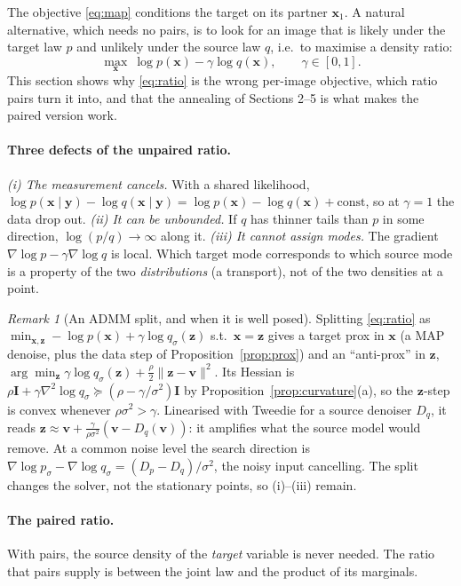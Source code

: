 \documentclass[11pt]{article}
\theoremstyle{definition}
\theoremstyle{remark}
\newtheorem{remark}{Remark}
\newcommand{\x}{\bm{x}}
\newcommand{\y}{\bm{y}}
\newcommand{\vv}{\bm{v}}
\newcommand{\Id}{\bm{I}}
\newcommand{\grad}{\nabla}
\begin{document}
The objective \eqref{eq:map} conditions the target on its partner $\x_1$. A natural
alternative, which needs no pairs, is to look for an image that is likely under the target
law $p$ and unlikely under the source law $q$, i.e.\ to maximise a density ratio:
\begin{equation}
  \max_{\x}\ \log p(\x) - \gamma\log q(\x),\qquad \gamma\in[0,1].
  \label{eq:ratio}
\end{equation}
This section shows why \eqref{eq:ratio} is the wrong per-image objective, which ratio pairs
turn it into, and that the annealing of Sections 2--5 is what makes the paired version work.

\paragraph{Three defects of the unpaired ratio.}
\emph{(i) The measurement cancels.} With a shared likelihood,
$\log p(\x\mid\y) - \log q(\x\mid\y) = \log p(\x) - \log q(\x) + \mathrm{const}$, so at
$\gamma=1$ the data drop out. \emph{(ii) It can be unbounded.} If $q$ has thinner tails than $p$
in some direction, $\log(p/q)\to\infty$ along it. \emph{(iii) It cannot assign modes.} The
gradient $\grad\log p - \gamma\grad\log q$ is local. Which target mode corresponds to which
source mode is a property of the two \emph{distributions} (a transport), not of the two
densities at a point.

\begin{remark}[An ADMM split, and when it is well posed]
Splitting \eqref{eq:ratio} as $\min_{\x,\bm z} -\log p(\x) + \gamma\log q_\sigma(\bm z)$ s.t.\
$\x=\bm z$ gives a target prox in $\x$ (a MAP denoise, plus the data step of
Proposition~\ref{prop:prox}) and an ``anti-prox'' in $\bm z$,
$\arg\min_{\bm z}\gamma\log q_\sigma(\bm z) + \tfrac\rho2\|\bm z - \vv\|^2$. Its Hessian is
$\rho\Id + \gamma\grad^2\log q_\sigma \succeq (\rho - \gamma/\sigma^2)\Id$ by
Proposition~\ref{prop:curvature}(a), so the $\bm z$-step is convex whenever $\rho\sigma^2>\gamma$.
Linearised with Tweedie for a source denoiser $D_q$, it reads
$\bm z \approx \vv + \tfrac{\gamma}{\rho\sigma^2}(\vv - D_q(\vv))$: it amplifies what the source
model would remove. At a common noise level the search direction is
$\grad\log p_\sigma - \grad\log q_\sigma = (D_p - D_q)/\sigma^2$, the noisy input cancelling. The
split changes the solver, not the stationary points, so (i)--(iii) remain.
\end{remark}

\paragraph{The paired ratio.} With pairs, the source density of the \emph{target} variable is
never needed. The ratio that pairs supply is between the joint law and the product of its
marginals.
\end{document}
